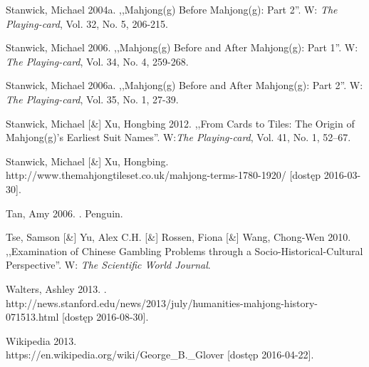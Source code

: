Stanwick, Michael 2004a. ,,Mahjong(g) Before Mahjong(g): Part 2''. W:
\textit{The Playing-card}, Vol. 32, No. 5, 206-215.

Stanwick, Michael 2006. ,,Mahjong(g) Before and After Mahjong(g): Part 1''. W:
\textit{The Playing-card}, Vol. 34, No. 4, 259-268.

Stanwick, Michael 2006a. ,,Mahjong(g) Before and After Mahjong(g): Part 2''. W:
\textit{The Playing-card}, Vol. 35, No. 1, 27-39.


Stanwick, Michael [\&] Xu, Hongbing 2012. ,,From Cards to Tiles: The Origin of
\mbox{Mahjong(g)'s} Earliest Suit Names''. W:\textit{The Playing-card}, Vol. 41,
No.
1, 52–67.

Stanwick, Michael [\&] Xu, Hongbing. 
\\http://www.themahjongtileset.co.uk/mahjong-terms-1780-1920/ [dostęp
2016-03-30].

Tan, Amy 2006. . Penguin.

Tse, Samson [\&] Yu, Alex C.H. [\&] Rossen, Fiona [\&] Wang, Chong-Wen
2010.
,,Examination of Chinese Gambling Problems through a Socio-Historical-Cultural Perspective''. W: \textit{The
Scientific World Journal}.

Walters, Ashley 2013. .
\\http://news.stanford.edu/news/2013/july/humanities-mahjong-history-071513.html
[dostęp 2016-08-30].

Wikipedia 2013. 
\\https://en.wikipedia.org/wiki/George\_B.\_Glover [dostęp 2016-04-22].

